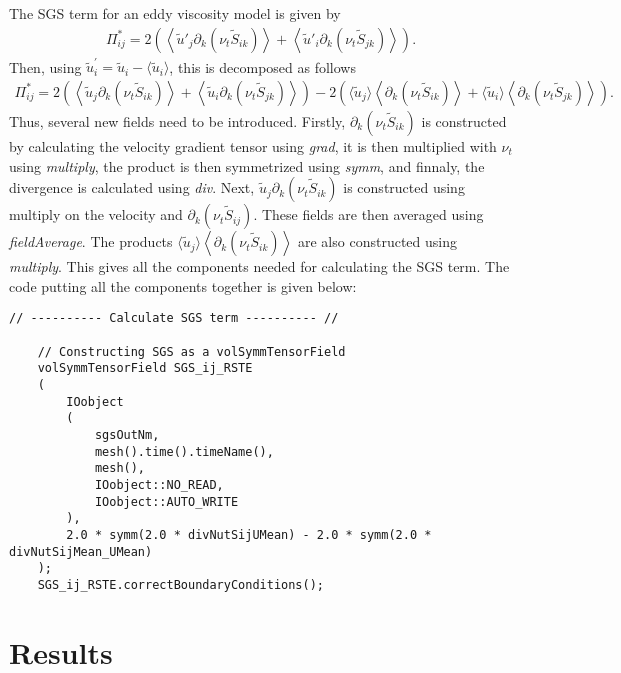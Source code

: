 The SGS term for an eddy viscosity model is given by
\begin{align}
    \Pi_{ij}^*
    =
    2 \left( \left\langle \tilde{u}'_j \partial_k (\nu_t \tilde{S}_{ik}) \right\rangle + \left\langle \tilde{u}'_i \partial_k (\nu_t \tilde{S}_{jk}) \right\rangle \right) .
\end{align}
Then, using $\tilde{u}^{\prime}_i = \tilde{u}_i - \langle \tilde{u}_i \rangle$, this is decomposed as follows
\begin{align}
    \Pi_{ij}^*
    =
    2\left( \left\langle \tilde{u}_j \partial_k (\nu_t \tilde{S}_{ik}) \right\rangle + \left\langle \tilde{u}_i \partial_k (\nu_t \tilde{S}_{jk}) \right\rangle  \right)
    -
    2\left( \langle \tilde{u}_j \rangle \left\langle \partial_k (\nu_t \tilde{S}_{ik}) \right\rangle + \langle \tilde{u}_i \rangle \left\langle \partial_k (\nu_t \tilde{S}_{jk}) \right\rangle \right).
\end{align}
Thus, several new fields need to be introduced.
Firstly, $\partial_k (\nu_t \tilde{S}_{ik})$ is constructed by calculating the velocity gradient tensor using \emph{grad}, it is then multiplied with $\nu_t$ using \emph{multiply}, the product is then symmetrized using \emph{symm}, and finnaly, the divergence is calculated using \emph{div}.
Next, $ \tilde{u}_j \partial_k (\nu_t \tilde{S}_{ik})$ is constructed using multiply on the velocity and $\partial_k (\nu_t \tilde{S}_{ij})$.
These fields are then averaged using \emph{fieldAverage}.
The products $\langle \tilde{u}_j \rangle \left\langle \partial_k (\nu_t \tilde{S}_{ik}) \right\rangle$ are also constructed using \emph{multiply}.
This gives all the components needed for calculating the SGS term.
The \OF code putting all the components together is given below:

\begin{lstlisting}[emph={ddt,div,laplacian}]
    // ---------- Calculate SGS term ---------- //

    // Constructing SGS as a volSymmTensorField 
    volSymmTensorField SGS_ij_RSTE
    (
        IOobject
        (
            sgsOutNm, 
            mesh().time().timeName(), 
            mesh(), 
            IOobject::NO_READ, 
            IOobject::AUTO_WRITE
        ),
        2.0 * symm(2.0 * divNutSijUMean) - 2.0 * symm(2.0 * divNutSijMean_UMean)
    );
    SGS_ij_RSTE.correctBoundaryConditions();
\end{lstlisting}

\section{Results}
\label{sec:results}


